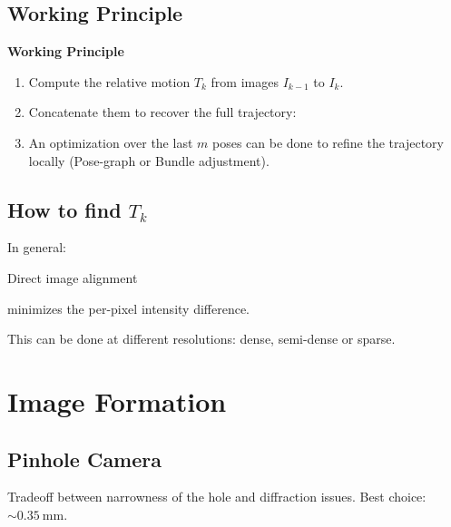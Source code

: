 \documentclass[10pt,a4paper]{scrartcl}
\begin{document}
\begin{multicols*}{2}
\subsection{Working Principle}


\textbf{Working Principle}

\begin{enumerate}
\item Compute the relative motion $T_k$ from images $I_{k-1}$ to $I_k$.
\item Concatenate them to recover the full trajectory:

\item An optimization over the last $m$ poses can be done to refine the trajectory locally (Pose-graph or Bundle adjustment).
\end{enumerate}

\subsection{How to find $T_k$}

In general:


Direct image alignment


minimizes the per-pixel intensity difference.

This can be done at different resolutions: dense, semi-dense or sparse.

\section{Image Formation}

\subsection{Pinhole Camera}

Tradeoff between narrowness of the hole and diffraction issues. Best choice: $\sim \SI{0.35}{\milli\meter}$.


\end{multicols*}
\end{document}
